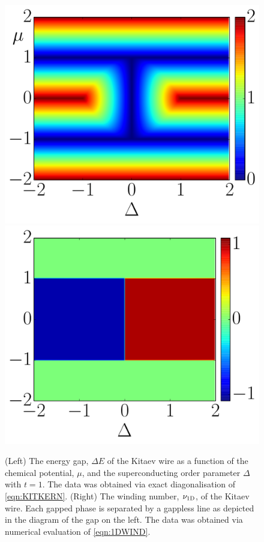 \begin{figure}
    \begin{center}
        \includegraphics[scale=0.4]{Chapter1/Chapter1Figs/PDF/kitwind.pdf}
        \includegraphics[scale=0.4]{Chapter1/Chapter1Figs/PDF/kitgap.pdf}
    \end{center}
    \caption{(Left) The energy gap, $\Delta E$ of the Kitaev wire as a function of the chemical potential, $\mu$, and the superconducting order parameter $\Delta$ with $t=1$. The data was obtained via exact diagonalisation of \eqref{eqn:KITKERN}. (Right) The winding number, $\nu_{\text{1D}}$, of the Kitaev wire. Each gapped phase is separated by a gappless line as depicted in the diagram of the gap on the left. The data was obtained via numerical evaluation of \eqref{eqn:1DWIND}. }
    \label{fig:kitspec}
\end{figure}

